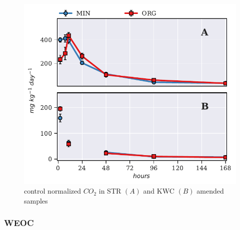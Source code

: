 \documentclass[12pt]{report}
\begin{document}
		\begin{figure}[H]
			\centering
			\includegraphics[scale=1]{thesis_figures/preliminary/control_normalized/Resp.pdf}
			\caption{control normalized $CO_2$ in STR $\left(A\right)$ and KWC $\left(B\right)$ amended   samples}
			\label{fig:nor_resp_treated_preliminary}
		\end{figure}
		
		
			
	\subsubsection{WEOC}
		
\end{document}
